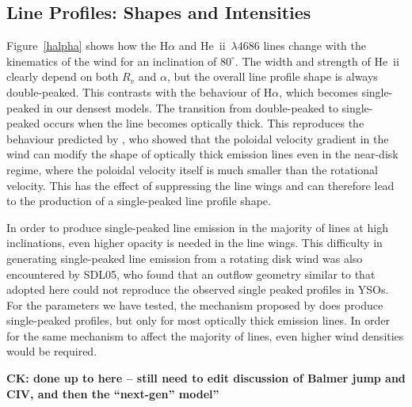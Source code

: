 \documentclass[preprint, a4paper, 11pt]{aastex}
\begin{document}
\subsection{Line Profiles: Shapes and Intensities}


Figure~\ref{halpha} shows how the H$\alpha$ and He~{\sc ii}~$\lambda
4686$ lines change with the kinematics of the wind for an inclination
of $80^\circ$. The width and strength of He~{\sc ii} clearly depend on
both $R_v$ and $\alpha$, but the overall line profile shape is always
double-peaked. This contrasts with the behaviour of H$\alpha$, which
becomes single-peaked in our densest models. The transition from
double-peaked to single-peaked occurs when the line becomes optically
thick. This reproduces the behaviour predicted by \cite{MC96}, who
showed that the poloidal velocity gradient in the wind can modify the
shape of optically thick emission lines even in the near-disk regime,
where the poloidal velocity itself is much smaller than the rotational
velocity. This has the effect of suppressing the line wings and
can therefore lead to the production of a single-peaked line profile
shape.

In order to produce single-peaked line emission in the majority of
lines at high inclinations, even higher opacity is needed in the
line wings. This difficulty in generating single-peaked line emission
from a rotating disk wind was also encountered by SDL05, who found
that an outflow geometry similar to that adopted here could not 
reproduce the observed single peaked profiles in YSOs. For the
parameters we have tested, the mechanism proposed by \cite{MC96} does
produce single-peaked profiles, but only for most optically thick
emission lines. In order for the same mechanism to affect the majority
of lines, even higher wind densities would be required.  

{\bf CK: done up to here -- still need to edit discussion of Balmer
  jump and CIV, and then the ``next-gen'' model''}
\end{document}
